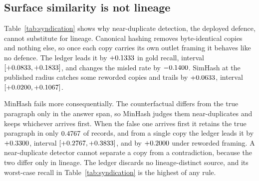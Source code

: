 \documentclass{article}
\begin{document}
\begin{table}[t]
\centering\small
\caption{Frozen-reader results under syndicated misinformation, $300$ two-hop
MuSiQue records, Qwen2.5-7B-Instruct. Gold is gold-answer recall and misled is
the rate of reporting the planted answer. \emph{Truth kept} is the fraction of
records whose true final paragraph survives the rule, \emph{worst case} the
lowest gold recall of the three conditions, and tokens the mean context length
at sixteen verbatim copies.}
\label{tab:syndication}
\end{table}

\subsection{Surface similarity is not lineage}
\label{sec:surface}

Table~\ref{tab:syndication} shows why near-duplicate detection, the deployed
defence, cannot substitute for lineage. Canonical hashing
\citep{lee2022deduplicating} removes byte-identical copies and nothing else, so
once each copy carries its own outlet framing it behaves like no defence. The
ledger leads it by $+0.1333$ in gold recall, interval
$[+0.0833, +0.1833]$, and changes the misled rate by $-0.1400$.
SimHash \citep{charikar2002simhash} at the published radius
\citep{manku2007nearduplicate} catches some reworded copies and trails by
$+0.0633$, interval $[+0.0200, +0.1067]$.

MinHash \citep{broder1997resemblance} fails more consequentially. The
counterfactual differs from the true paragraph only in the answer span, so
MinHash judges them near-duplicates and keeps whichever arrives first. When the
false one arrives first it retains the true paragraph in only
$0.4767$ of records, and from a single copy the ledger leads it by
$+0.3300$, interval $[+0.2767, +0.3833]$, and by
$+0.2000$ under reworded framing. A near-duplicate detector
cannot separate a copy from a contradiction, because the two differ only in
lineage. The ledger discards no lineage-distinct source, and its worst-case
recall in Table~\ref{tab:syndication} is the highest of any rule.
\end{document}

